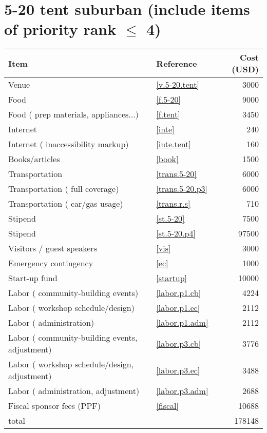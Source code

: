 \section*{5-20 tent suburban (include items of priority rank $\leq$ 4)}
\begin{center}
\begin{tabular}{llr}
Item & Reference & Cost (USD) \\ \hline
Venue & \ref{v.5-20.tent} & 3000 \\
Food & \ref{f.5-20} & 9000 \\
Food ( prep materials, appliances...) & \ref{f.tent} & 3450 \\
Internet & \ref{inte} & 240 \\
Internet ( inaccessibility markup) & \ref{inte.tent} & 160 \\
Books/articles & \ref{book} & 1500 \\
Transportation & \ref{trans.5-20} & 6000 \\
Transportation ( full coverage) & \ref{trans.5-20.p3} & 6000 \\
Transportation ( car/gas usage) & \ref{trans.r.s} & 710 \\
Stipend & \ref{st.5-20} & 7500 \\
Stipend & \ref{st.5-20.p4} & 97500 \\
Visitors / guest speakers & \ref{vis} & 3000 \\
Emergency contingency & \ref{ec} & 1000 \\
Start-up fund & \ref{startup} & 10000 \\
Labor ( community-building events) & \ref{labor.p1.cb} & 4224 \\
Labor ( workshop schedule/design) & \ref{labor.p1.ec} & 2112 \\
Labor ( administration) & \ref{labor.p1.adm} & 2112 \\
Labor ( community-building events, adjustment) & \ref{labor.p3.cb} & 3776 \\
Labor ( workshop schedule/design, adjustment) & \ref{labor.p3.ec} & 3488 \\
Labor ( administration, adjustment) & \ref{labor.p3.adm} & 2688 \\
Fiscal sponsor fees (PPF) & \ref{fiscal} & 10688 \\ \hline
total &  & 178148
\end{tabular}
\end{center}
\newpage

